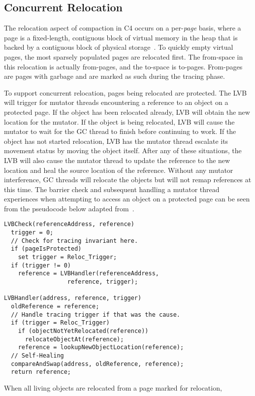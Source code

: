 \documentclass{sig-alternate}
\begin{document}
\subsection{Concurrent Relocation}
\label{sec:c4Relocation}

The relocation aspect of compaction in C4 occurs on a per-\emph{page}
basis, where a page is a fixed-length, contiguous block of virtual memory in the heap
that is backed by a contiguous block of physical storage~\cite{wiki:page}\cite{Tene:C4}.
To quickly empty virtual pages, the most sparsely populated pages are relocated
first. The from-space in this relocation is actually from-pages, and the to-space
is to-pages. From-pages are pages with garbage
and are marked as such during the tracing phase.

To support concurrent relocation, pages being relocated are protected. 
The LVB will trigger for mutator threads encountering a reference to an object
on a protected page. If the object has been relocated already, LVB will
obtain the new location for the mutator. If the object is being relocated, 
LVB will cause the mutator to wait
for the GC thread to finish before continuing to work.
If the object has not started relocation, LVB has the mutator thread 
escalate its movement status by moving the object itself. After any of 
these situations, the LVB will also cause the mutator thread to update 
the reference to the new location and heal the source location of the reference.
Without any mutator interference, GC threads will relocate the objects but
will not remap references at this time. The barrier check and subsequent
handling a mutator thread experiences when attempting to access an object on a
protected page can be seen from the pseudocode below adapted from~\cite{Tene:C4}.
\begin{verbatim}
LVBCheck(referenceAddress, reference)
  trigger = 0;
  // Check for tracing invariant here.
  if (pageIsProtected)
    set trigger = Reloc_Trigger;
  if (trigger != 0)
    reference = LVBHandler(referenceAddress, 
                  reference, trigger);
    
LVBHandler(address, reference, trigger)
  oldReference = reference;
  // Handle tracing trigger if that was the cause.
  if (trigger = Reloc_Trigger) 
    if (objectNotYetRelocated(reference))
      relocateObjectAt(reference);
    reference = lookupNewObjectLocation(reference);
  // Self-Healing
  compareAndSwap(address, oldReference, reference);
  return reference;
\end{verbatim}
When all living objects are relocated from a page marked for relocation,
\end{document}
